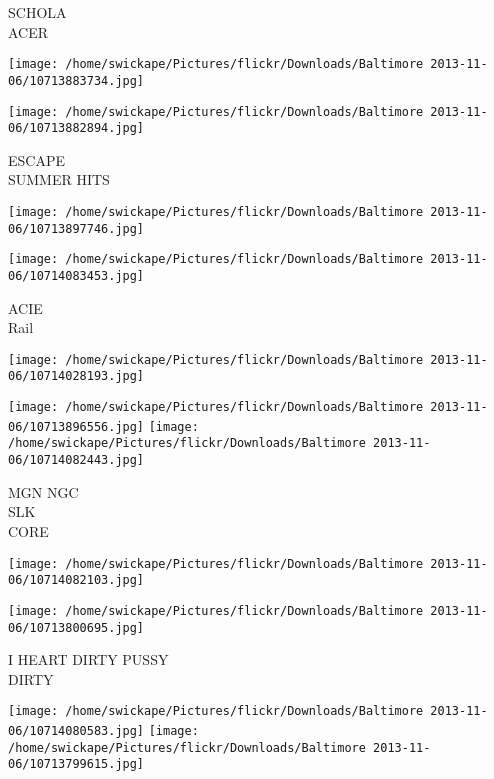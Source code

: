 \documentclass[10pt,letterpaper]{article}
\begin{document}
SCHOLA\\
ACER\\
\pagebreak

\texttt{[image: /home/swickape/Pictures/flickr/Downloads/Baltimore 2013-11-06/10713883734.jpg]}

\vspace{0.25in}
\texttt{[image: /home/swickape/Pictures/flickr/Downloads/Baltimore 2013-11-06/10713882894.jpg]}

ESCAPE\\
SUMMER HITS\\
\pagebreak

\texttt{[image: /home/swickape/Pictures/flickr/Downloads/Baltimore 2013-11-06/10713897746.jpg]}

\vspace{0.25in}
\texttt{[image: /home/swickape/Pictures/flickr/Downloads/Baltimore 2013-11-06/10714083453.jpg]}

ACIE\\
Rail\\
\pagebreak

\texttt{[image: /home/swickape/Pictures/flickr/Downloads/Baltimore 2013-11-06/10714028193.jpg]}

\vspace{0.25in}
\texttt{[image: /home/swickape/Pictures/flickr/Downloads/Baltimore 2013-11-06/10713896556.jpg]}
\texttt{[image: /home/swickape/Pictures/flickr/Downloads/Baltimore 2013-11-06/10714082443.jpg]}

MGN NGC\\
SLK\\
CORE\\
\pagebreak

\texttt{[image: /home/swickape/Pictures/flickr/Downloads/Baltimore 2013-11-06/10714082103.jpg]}

\vspace{0.25in}
\texttt{[image: /home/swickape/Pictures/flickr/Downloads/Baltimore 2013-11-06/10713800695.jpg]}

I HEART DIRTY PUSSY\\
DIRTY\\
\pagebreak

\texttt{[image: /home/swickape/Pictures/flickr/Downloads/Baltimore 2013-11-06/10714080583.jpg]}
\texttt{[image: /home/swickape/Pictures/flickr/Downloads/Baltimore 2013-11-06/10713799615.jpg]}
\end{document}
